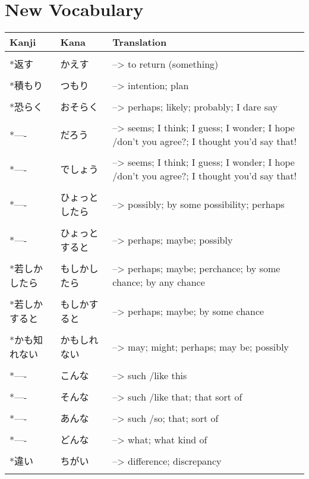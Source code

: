\documentclass{article}
\begin{document}
\part*{New Vocabulary}
\begin{tabular}{ l | l p{13cm} }
Kanji&Kana&Translation\\ \hline\\[-1em]
*返す&かえす&--> to return (something)\\ \hline\\[-1em]
*積もり&つもり&--> intention; plan \\ \hline\\[-1em]
*恐らく&おそらく&--> perhaps; likely; probably; I dare say \\ \hline\\[-1em]
*----&だろう&--> seems; I think; I guess; I wonder; I hope /don't you agree?; I thought you'd say that! \\ \hline\\[-1em]
*----&でしょう&--> seems; I think; I guess; I wonder; I hope /don't you agree?; I thought you'd say that! \\ \hline\\[-1em]
*----&ひょっとしたら&--> possibly; by some possibility; perhaps \\ \hline\\[-1em]
*----&ひょっとすると&--> perhaps; maybe; possibly \\ \hline\\[-1em]
*若しかしたら&もしかしたら&--> perhaps; maybe; perchance; by some chance; by any chance \\ \hline\\[-1em]
*若しかすると&もしかすると&--> perhaps; maybe; by some chance \\ \hline\\[-1em]
*かも知れない&かもしれない&--> may; might; perhaps; may be; possibly \\ \hline\\[-1em]
*----&こんな&--> such /like this \\ \hline\\[-1em]
*----&そんな&--> such /like that; that sort of \\ \hline\\[-1em]
*----&あんな&--> such /so; that; sort of \\ \hline\\[-1em]
*----&どんな&--> what; what kind of \\ \hline\\[-1em]
*違い&ちがい&--> difference; discrepancy \\ \hline\\[-1em]

\end{tabular}
\end{document}
